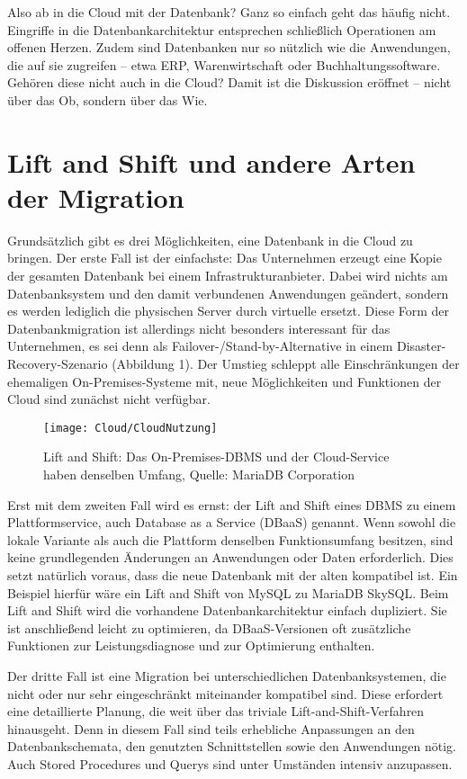 Also ab in die Cloud mit der Datenbank? Ganz so einfach geht das häufig nicht. Eingriffe in die Datenbankarchitektur entsprechen schließlich Operationen am offenen Herzen. Zudem sind Datenbanken nur so nützlich wie die Anwendungen, die auf sie zugreifen – etwa ERP, Warenwirtschaft oder Buchhaltungssoftware. Gehören diese nicht auch in die Cloud? Damit ist die Diskussion eröffnet – nicht über das Ob, sondern über das Wie.

\section{Lift and Shift und andere Arten der Migration}


Grundsätzlich gibt es drei Möglichkeiten, eine Datenbank in die Cloud zu bringen. Der erste Fall ist der einfachste: Das Unternehmen erzeugt eine Kopie der gesamten Datenbank bei einem Infrastrukturanbieter. Dabei wird nichts am Datenbanksystem und den damit verbundenen Anwendungen geändert, sondern es werden lediglich die physischen Server durch virtuelle ersetzt. Diese Form der Datenbankmigration ist allerdings nicht besonders interessant für das Unternehmen, es sei denn als Failover-/Stand-by-Alternative in einem Disaster-Recovery-Szenario (Abbildung 1). Der Umstieg schleppt alle Einschränkungen der ehemaligen On-Premises-Systeme mit, neue Möglichkeiten und Funktionen der Cloud sind zunächst nicht verfügbar.

\begin{figure}
	\texttt{[image: Cloud/CloudNutzung]}
	\caption[Lift and Shift]{Lift and Shift: Das On-Premises-DBMS und der Cloud-Service haben denselben Umfang, Quelle: MariaDB Corporation}
\end{figure}


Erst mit dem zweiten Fall wird es ernst: der Lift and Shift eines DBMS zu einem Plattformservice, auch Database as a Service (DBaaS) genannt. Wenn sowohl die lokale Variante als auch die Plattform denselben Funktionsumfang besitzen, sind keine grundlegenden Änderungen an Anwendungen oder Daten erforderlich. Dies setzt natürlich voraus, dass die neue Datenbank mit der alten kompatibel ist. Ein Beispiel hierfür wäre ein Lift and Shift von MySQL zu MariaDB SkySQL. Beim Lift and Shift wird die vorhandene Datenbankarchitektur einfach dupliziert. Sie ist anschließend leicht zu optimieren, da DBaaS-Versionen oft zusätzliche Funktionen zur Leistungsdiagnose und zur Optimierung enthalten.

Der dritte Fall ist eine Migration bei unterschiedlichen Datenbanksystemen, die nicht oder nur sehr eingeschränkt miteinander kompatibel sind. Diese erfordert eine   detaillierte Planung, die weit über das triviale Lift-and-Shift-Verfahren   hinausgeht. Denn in diesem Fall sind teils erhebliche Anpassungen an den    Datenbankschemata, den genutzten Schnittstellen sowie den Anwendungen nötig. Auch     Stored Procedures und Querys sind unter Umständen intensiv anzupassen.
     

